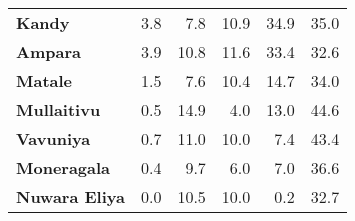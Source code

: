 \begin{tabular}{lrrrrr}
\textbf{Kandy       } &         3.8 &         7.8 &         10.9 &             34.9 &        35.0 \\
\textbf{Ampara      } &         3.9 &        10.8 &         11.6 &             33.4 &        32.6 \\
\textbf{Matale      } &         1.5 &         7.6 &         10.4 &             14.7 &        34.0 \\
\textbf{Mullaitivu  } &         0.5 &        14.9 &          4.0 &             13.0 &        44.6 \\
\textbf{Vavuniya    } &         0.7 &        11.0 &         10.0 &              7.4 &        43.4 \\
\textbf{Moneragala  } &         0.4 &         9.7 &          6.0 &              7.0 &        36.6 \\
\textbf{Nuwara Eliya} &         0.0 &        10.5 &         10.0 &              0.2 &        32.7 \\
\bottomrule
\end{tabular}
